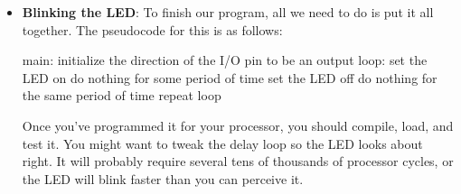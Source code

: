 \documentclass{report}
\begin{document}
\begin{itemize}
\begin{cppcode}
                #define PERIPH_BASE 0x40000000UL
                #define APB2PERIPH_BASE (PERIPH_BASE + 0x00010000UL)
                #define GPIOA_BASE (APB2PERIPH_BASE + 0x00000800UL)
                #define GPIOA ((GPIO_TypeDef *)GPIOA_BASE)
            \end{cppcode}
            \bigbreak \noindent 
            The header file describes many registers we haven’t looked at. These are also in the user manual section, with a lot more explanation. I prefer accessing the registers via the structure because it groups related functions together, often letting you work with the ports interchangeably
            \bigbreak \noindent 
            Once we have the LED on, we’ll need to turn it off again. You just need to clear those same bits
            \bigbreak \noindent 
            \begin{cppcode}
                // STM32F103 processor
                GPIOA->ODR &= ~(1 << 2); // IO1_2 low
            \end{cppcode}
        \item \textbf{Blinking the LED}: To finish our program, all we need to do is put it all together. The pseudocode for this is as follows:
            \bigbreak \noindent 
            \begin{cppcode}
                main:
                    initialize the direction of the I/O pin to be an output
                loop:
                    set the LED on
                    do nothing for some period of time
                    set the LED off
                    do nothing for the same period of time
                    repeat loop
            \end{cppcode}
            \bigbreak \noindent 
            Once you’ve programmed it for your processor, you should compile, load, and test it. You might want to tweak the delay loop so the LED looks about right. It will probably require several tens of thousands of processor cycles, or the LED will blink faster than you can perceive it.
            \bigbreak \noindent 



    \end{itemize}




    
\end{document}
